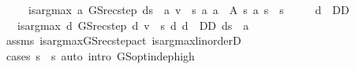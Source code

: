 \begin{isabellebody}
\ \ \ \ \ {\isachardoublequoteopen}is{\isacharunderscore}{\kern0pt}arg{\isacharunderscore}{\kern0pt}max\ {\isacharparenleft}{\kern0pt}{\isasymlambda}a{\isachardot}{\kern0pt}\ GS{\isacharunderscore}{\kern0pt}rec{\isacharunderscore}{\kern0pt}step\ {\isacharparenleft}{\kern0pt}d{\isacharparenleft}{\kern0pt}s\ {\isacharcolon}{\kern0pt}{\isacharequal}{\kern0pt}\ a{\isacharparenright}{\kern0pt}{\isacharparenright}{\kern0pt}\ v\ {\isachardollar}{\kern0pt}\ s{\isacharparenright}{\kern0pt}\ {\isacharparenleft}{\kern0pt}{\isasymlambda}a{\isachardot}{\kern0pt}\ a\ {\isasymin}\ A\ s{\isacharparenright}{\kern0pt}\ a{\isachardoublequoteclose}\ {\isachardoublequoteopen}s{\isacharprime}{\kern0pt}\ {\isasymle}\ s{\isachardoublequoteclose}\isanewline
\ \ \ \ \ {\isachardoublequoteopen}d\ {\isasymin}\ D\isactrlsub D{\isachardoublequoteclose}\isanewline
\ \ \ {\isachardoublequoteopen}is{\isacharunderscore}{\kern0pt}arg{\isacharunderscore}{\kern0pt}max\ {\isacharparenleft}{\kern0pt}{\isasymlambda}d{\isachardot}{\kern0pt}\ GS{\isacharunderscore}{\kern0pt}rec{\isacharunderscore}{\kern0pt}step\ d\ v\ {\isachardollar}{\kern0pt}\ s{\isacharprime}{\kern0pt}{\isacharparenright}{\kern0pt}\ {\isacharparenleft}{\kern0pt}{\isasymlambda}d{\isachardot}{\kern0pt}\ d\ {\isasymin}\ D\isactrlsub D{\isacharparenright}{\kern0pt}\ {\isacharparenleft}{\kern0pt}d{\isacharparenleft}{\kern0pt}s\ {\isacharcolon}{\kern0pt}{\isacharequal}{\kern0pt}\ a{\isacharparenright}{\kern0pt}{\isacharparenright}{\kern0pt}{\isachardoublequoteclose}\isanewline
%
\isadelimproof
\ \ %
\endisadelimproof
%
\isatagproof
{}\isamarkupfalse%
\ assms\ is{\isacharunderscore}{\kern0pt}arg{\isacharunderscore}{\kern0pt}max{\isacharunderscore}{\kern0pt}GS{\isacharunderscore}{\kern0pt}rec{\isacharunderscore}{\kern0pt}step{\isacharunderscore}{\kern0pt}act\ is{\isacharunderscore}{\kern0pt}arg{\isacharunderscore}{\kern0pt}max{\isacharunderscore}{\kern0pt}linorderD{\isacharparenleft}{\kern0pt}{}{\isacharparenright}{\kern0pt}\isanewline
\ \ \isamarkupfalse%
\ {\isacharparenleft}{\kern0pt}cases\ {\isachardoublequoteopen}s\ {\isacharequal}{\kern0pt}\ s{\isacharprime}{\kern0pt}{\isachardoublequoteclose}{\isacharparenright}{\kern0pt}\ {\isacharparenleft}{\kern0pt}auto\ intro{\isacharbang}{\kern0pt}{\isacharcolon}{\kern0pt}\ GS{\isacharunderscore}{\kern0pt}opt{\isacharunderscore}{\kern0pt}indep{\isacharunderscore}{\kern0pt}high{\isacharparenright}{\kern0pt}%
\endisatagproof
{\isafoldproof}%
%
\isadelimproof
\isanewline
%
\endisadelimproof
\isanewline

\end{isabellebody}
